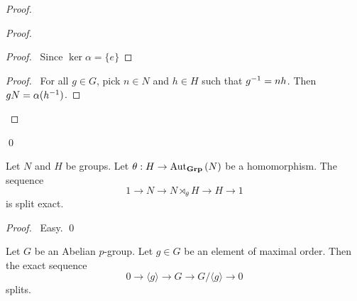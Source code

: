 \begin{proof}
\pf
{}
\begin{proof}
	\begin{proof}
		\pf\ Since $\ker \alpha = \{e\}$
	\end{proof}
	\begin{proof}
		\pf\ For all $g \in G$, pick $n \in N$ and $h \in H$ such that ${g}^{-1} = nh$. Then $gN = \alpha({h}^{-1})$.
	\end{proof}
\end{proof}
\qed
\end{proof}

\begin{prop}
Let $N$ and $H$ be groups. Let $\theta : H \rightarrow \mathrm{Aut}_{\mathbf{Grp}} \left( {N} \right)$ be a homomorphism. The sequence
\[ 1 \rightarrow N \rightarrow N \rtimes_\theta H \rightarrow H \rightarrow 1 \]
is split exact.
\end{prop}

\begin{proof}
\pf\ Easy. \qed
\end{proof}

\begin{prop}
Let $G$ be an Abelian $p$-group. Let $g \in G$ be an element of maximal order. Then the exact sequence
\[ 0 \rightarrow \langle g \rangle \rightarrow G \rightarrow G / \langle g \rangle \rightarrow 0 \]
splits.
\end{prop}

